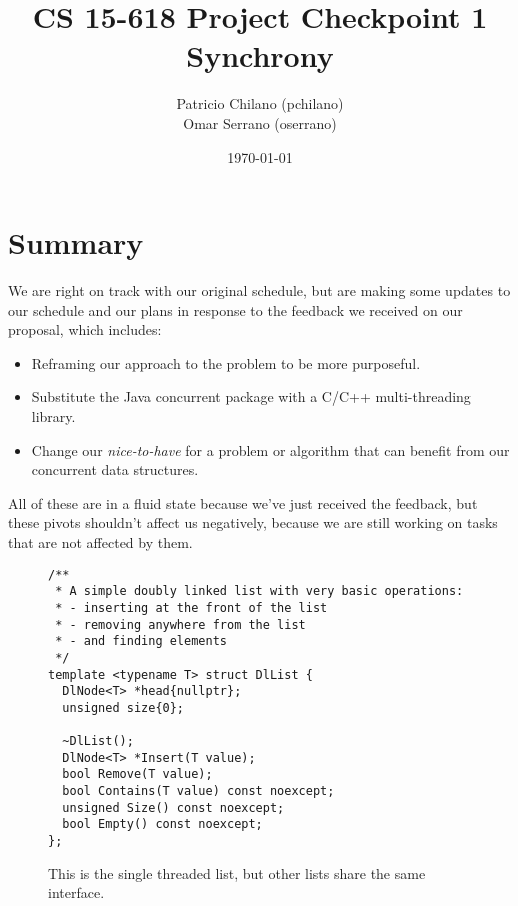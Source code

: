 \documentclass[11pt]{article}
\title{\vspace{-25pt}
\huge CS 15-618 Project Checkpoint 1 \\
\huge Synchrony
}
\author{
    Patricio Chilano (pchilano) \\
    Omar Serrano (oserrano)
}
\date{\today}
\begin{document}


\maketitle

\section*{Summary}
We are right on track with our original schedule, but are making some updates to
our schedule and our plans in response to the feedback we received on our
proposal, which includes:

\begin{itemize}
\item
Reframing our approach to the problem to be more purposeful.
\item
Substitute the Java concurrent package with a C/C++ multi-threading library.
\item
Change our {\it nice-to-have} for a problem or algorithm that can benefit from
our concurrent data structures.
\end{itemize}

All of these are in a fluid state because we've just received the feedback, but
these pivots shouldn't affect us negatively, because we are still working on
tasks that are not affected by them.

\begin{figure}
\begin{center}
\begin{lstlisting}
/**
 * A simple doubly linked list with very basic operations:
 * - inserting at the front of the list
 * - removing anywhere from the list
 * - and finding elements
 */
template <typename T> struct DlList {
  DlNode<T> *head{nullptr};
  unsigned size{0};

  ~DlList();
  DlNode<T> *Insert(T value);
  bool Remove(T value);
  bool Contains(T value) const noexcept;
  unsigned Size() const noexcept;
  bool Empty() const noexcept;
};
\end{lstlisting}
\caption{
This is the single threaded list, but other lists share the same interface.}
\label{fig:dllist}
\end{center}
\end{figure}
\end{document}
